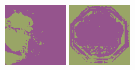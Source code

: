 \documentclass{article}
\begin{document}
\begin{figure}[t]
\begin{minipage}[c]{.21\linewidth}
  \end{minipage}
  \begin{minipage}[c]{.21\linewidth}
    \centering\centerline{\includegraphics[width=\linewidth]{imgs/dennis_cal/saxophone/products/0.png}}
  \end{minipage}
  \begin{minipage}[c]{.21\linewidth}
    \centering\centerline{\includegraphics[width=\linewidth]{imgs/dennis_cal/stop/products/0.png}}

\end{minipage}
\end{figure}
\end{document}
